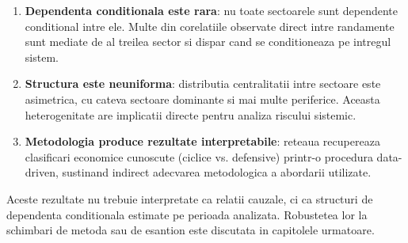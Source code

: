 \begin{enumerate}
    \item \textbf{Dependenta conditionala este rara}: nu toate sectoarele sunt
    dependente conditional intre ele. Multe din corelatiile observate direct
    intre randamente sunt mediate de al treilea sector si dispar cand se
    conditioneaza pe intregul sistem.

    \item \textbf{Structura este neuniforma}: distributia centralitatii intre
    sectoare este asimetrica, cu cateva sectoare dominante si mai multe
    periferice. Aceasta heterogenitate are implicatii directe pentru analiza
    riscului sistemic.

    \item \textbf{Metodologia produce rezultate interpretabile}: reteaua
    recupereaza clasificari economice cunoscute (ciclice vs. defensive) printr-o
    procedura data-driven, sustinand indirect adecvarea metodologica a abordarii utilizate.
\end{enumerate}

Aceste rezultate nu trebuie interpretate ca relatii cauzale, ci ca structuri
de dependenta conditionala estimate pe perioada analizata. Robustetea lor
la schimbari de metoda sau de esantion este discutata in capitolele urmatoare.